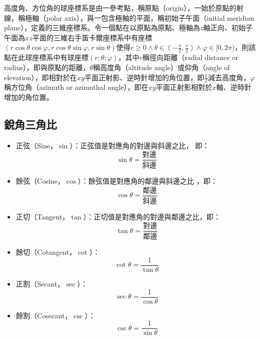 \documentclass[a4paper,12pt]{report}
\begin{document}
高度角、方位角的球座標系是由一參考點，稱原點（origin），一始於原點的射線，稱極軸（polar axis），與一包含極軸的平面，稱初始子午面（initial meridian plane），定義的三維座標系。令一個點在以原點為原點、極軸為$z$軸正向、初始子午面為$xz$平面的三維右手笛卡爾座標系中有座標$(r\cos\theta\cos\varphi,r\cos\theta\sin\varphi,r\sin\theta)$使得$r\geq 0\land\theta\in(-\frac{\pi}{2},\frac{\pi}{2})\land\varphi\in[0,2\pi)$，則該點在此球座標系中有球座標$(r;\theta;\varphi)$，其中$r$稱徑向距離（radial distance or radius），即與原點的距離，$\theta$稱高度角（altitude angle）或仰角（angle of elevation），即相對於在$xy$平面正射影、逆時針增加的角位置，即$\frac{\pi}{2}$減去高度角，$\varphi$稱方位角（azimuth or azimuthal angle），即在$xy$平面正射影相對於$x$軸、逆時針增加的角位置。
\subsection{銳角三角比}
\begin{itemize}
  \item 正弦（Sine，$\sin$）：正弦值是對應角的對邊與斜邊之比， 即：\[\sin \theta = \frac{\text{對邊}}{\text{斜邊}}\]
  \item 餘弦（Cosine，$\cos$）：餘弦值是對應角的鄰邊與斜邊之比 ，即：\[\cos \theta = \frac{\text{鄰邊}}{\text{斜邊}}\]
  \item 正切（Tangent，$\tan$）：正切值是對應角的對邊與鄰邊之比，即：\[\tan \theta = \frac{\text{對邊}}{\text{鄰邊}}\]
  \item 餘切（Cotangent，$\cot$）：\[\cot \theta = \frac{1}{\tan \theta}\]
  \item 正割（Secant，$\sec$）：\[\sec \theta = \frac{1}{\cos \theta}\]
  \item 餘割（Cosecant，$\csc$）：\[\csc \theta = \frac{1}{\sin \theta}\]
\end{itemize}
\end{document}
